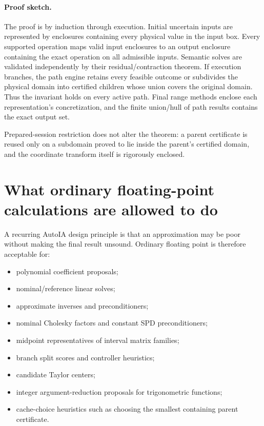 \documentclass[11pt]{article}
\begin{document}
\paragraph{Proof sketch.}
The proof is by induction through execution.  Initial uncertain inputs are
represented by enclosures containing every physical value in the input box.
Every supported operation maps valid input enclosures to an output enclosure
containing the exact operation on all admissible inputs.  Semantic solves are
validated independently by their residual/contraction theorem.  If execution
branches, the path engine retains every feasible outcome or subdivides the
physical domain into certified children whose union covers the original domain.
Thus the invariant holds on every active path.  Final range methods enclose each
representation's concretization, and the finite union/hull of path results
contains the exact output set.

Prepared-session restriction does not alter the theorem: a parent certificate is
reused only on a subdomain proved to lie inside the parent's certified domain,
and the coordinate transform itself is rigorously enclosed.

\section{What ordinary floating-point calculations are allowed to do}

A recurring AutoIA design principle is that an approximation may be poor without
making the final result unsound.  Ordinary floating point is therefore acceptable
for:
\begin{itemize}[leftmargin=*]
\item polynomial coefficient proposals;
\item nominal/reference linear solves;
\item approximate inverses and preconditioners;
\item nominal Cholesky factors and constant SPD preconditioners;
\item midpoint representatives of interval matrix families;
\item branch split scores and controller heuristics;
\item candidate Taylor centers;
\item integer argument-reduction proposals for trigonometric functions;
\item cache-choice heuristics such as choosing the smallest containing parent
certificate.
\end{itemize}
\end{document}
